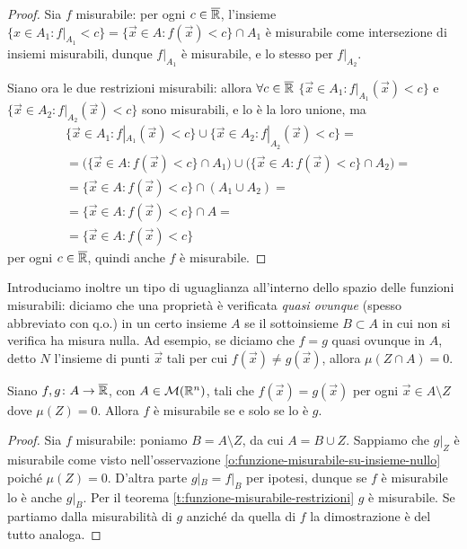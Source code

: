 \begin{proof}
	Sia $f$ misurabile: per ogni $c\in\overline{\mathbb{R}}$, l'insieme $\{x\in A_1\colon f|_{A_1}<c\}=\{\vec x\in A\colon f(\vec x)<c\}\cap A_1$ è misurabile come intersezione di insiemi misurabili, dunque $f|_{A_1}$ è misurabile, e lo stesso per $f|_{A_2}$.

	Siano ora le due restrizioni misurabili: allora $\forall c\in\overline{\mathbb{R}}$ $\{\vec x\in A_1\colon f|_{A_1}(\vec x)<c\}$ e $\{\vec x\in A_2\colon f|_{A_2}(\vec x)<c\}$ sono misurabili, e lo è la loro unione, ma
	\begin{equation}
		\begin{aligned}
			&\{\vec x\in A_1\colon f|_{A_1}(\vec x)<c\}\cup\{\vec x\in A_2\colon f|_{A_2}(\vec x)<c\}=\\
			&=\big(\{\vec x\in A\colon f(\vec x)<c\}\cap A_1\big)\cup\big(\{\vec x\in A\colon f(\vec x)<c\}\cap A_2\big)=\\
			&=\{\vec x\in A\colon f(\vec x)<c\}\cap(A_1\cup A_2)=\\
			&=\{\vec x\in A\colon f(\vec x)<c\}\cap A=\\
			&=\{\vec x\in A\colon f(\vec x)<c\}
		\end{aligned}
	\end{equation}
	per ogni $c\in\overline{\mathbb{R}}$, quindi anche $f$ è misurabile.
\end{proof}
Introduciamo inoltre un tipo di uguaglianza all'interno dello spazio delle funzioni misurabili: diciamo che una proprietà è verificata \emph{quasi ovunque} (spesso abbreviato con q.o.) in un certo insieme $A$ se il sottoinsieme $B\subset A$ in cui non si verifica ha misura nulla.
Ad esempio, se diciamo che $f=g$ quasi ovunque in $A$, detto $N$ l'insieme di punti $\vec x$ tali per cui $f(\vec x)\ne g(\vec x)$, allora $\mu(Z\cap A)=0$.
\begin{teorema} \label{t:misurabile-qo}
	Siano $f,g\colon A\to\overline{\mathbb{R}}$, con $A\in\mathcal M(\mathbb{R}^n)$, tali che $f(\vec x)=g(\vec x)$ per ogni $\vec x\in A\setminus Z$ dove $\mu(Z)=0$.
	Allora $f$ è misurabile se e solo se lo è $g$.
\end{teorema}
\begin{proof}
	Sia $f$ misurabile: poniamo $B=A\setminus Z$, da cui $A=B\cup Z$.
	Sappiamo che $g|_Z$ è misurabile come visto nell'osservazione \ref{o:funzione-misurabile-su-insieme-nullo} poich\'e $\mu(Z)=0$.
	D'altra parte $g|_{B}=f|_{B}$ per ipotesi, dunque se $f$ è misurabile lo è anche $g|_B$.
	Per il teorema \ref{t:funzione-misurabile-restrizioni} $g$ è misurabile.
	Se partiamo dalla misurabilità di $g$ anzich\'e da quella di $f$ la dimostrazione è del tutto analoga.
\end{proof}
